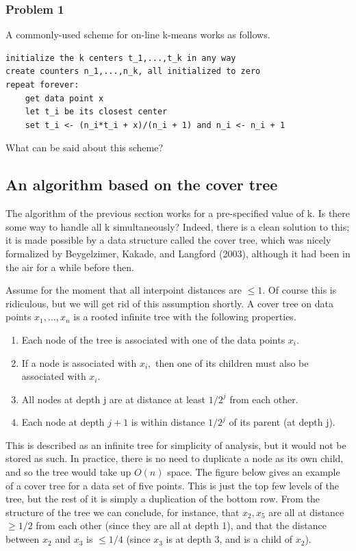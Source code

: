 \documentclass[letterpaper,10pt]{article}
\theoremstyle{plain}
\begin{document}
\subsubsection*{Problem 1}
A commonly-used scheme for on-line k-means works as follows. 
\begin{verbatim}
initialize the k centers t_1,...,t_k in any way
create counters n_1,...,n_k, all initialized to zero
repeat forever:
    get data point x
    let t_i be its closest center
    set t_i <- (n_i*t_i + x)/(n_i + 1) and n_i <- n_i + 1
\end{verbatim}
What can be said about this scheme? 

\subsection{An algorithm based on the cover tree}
The algorithm of the previous section works for a pre-specified value of k.  Is there some way to handle all k simultaneously?  Indeed, there is a clean solution to this;  it is made possible by a data structure called the cover tree, which was nicely formalized by Beygelzimer, Kakade, and Langford (2003), although it had been in the air for a while before then. 

Assume for the moment that all interpoint distances are $\le1$.  Of course this is ridiculous, but we will get rid of this assumption shortly.  A cover tree on data points $x_{1},...,x_{n}$ is a rooted infinite tree with the following properties. 
\begin{enumerate}
    \item Each node of the tree is associated with one of the data points $x_{i}$. 
    \item If a node is associated with $x_{i},$ then one of its children must also be associated with $x_{i}$. 
    \item All nodes at depth j are at distance at least $1/2^{j}$ from each other. 
    \item Each node at depth $j+1$ is within distance $1/2^{j}$ of its parent (at depth j). 
\end{enumerate}
This is described as an infinite tree for simplicity of analysis, but it would not be stored as such.  In practice, there is no need to duplicate a node as its own child, and so the tree would take up $O(n)$ space.  The figure below gives an example of a cover tree for a data set of five points.  This is just the top few levels of the tree, but the rest of it is simply a duplication of the bottom row.  From the structure of the tree we can conclude, for instance, that $x_{2}, x_5$ are all at distance $\ge1/2$ from each other (since they are all at depth 1), and that the distance between $x_{2}$ and $x_{3}$ is $\le1/4$ (since $x_{3}$ is at depth 3, and is a child of $x_{2}$). 
\end{document}
